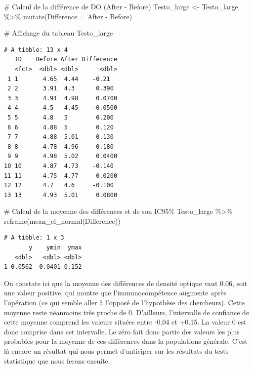 \documentclass[
  a4paper,
  DIV=11,
  numbers=noendperiod,
  oneside]{scrreprt}
\newenvironment{Shaded}{}{}
\newcommand{\AttributeTok}[1]{\textcolor[rgb]{0.84,0.23,0.29}{#1}}
\newcommand{\CommentTok}[1]{\textcolor[rgb]{0.42,0.45,0.49}{#1}}
\newcommand{\FunctionTok}[1]{\textcolor[rgb]{0.44,0.26,0.76}{#1}}
\newcommand{\NormalTok}[1]{\textcolor[rgb]{0.14,0.16,0.18}{#1}}
\newcommand{\OtherTok}[1]{\textcolor[rgb]{0.44,0.26,0.76}{#1}}
\newcommand{\SpecialCharTok}[1]{\textcolor[rgb]{0.00,0.36,0.77}{#1}}
\begin{document}
\begin{Shaded}
\begin{Highlighting}[]
\CommentTok{\# Calcul de la différence de DO (After {-} Before)}
\NormalTok{Testo\_large }\OtherTok{\textless{}{-}}\NormalTok{ Testo\_large }\SpecialCharTok{\%\textgreater{}\%} 
  \FunctionTok{mutate}\NormalTok{(}\AttributeTok{Difference =}\NormalTok{ After }\SpecialCharTok{{-}}\NormalTok{ Before)}

\CommentTok{\# Affichage du tableau}
\NormalTok{Testo\_large}
\end{Highlighting}
\end{Shaded}

\begin{verbatim}
# A tibble: 13 x 4
   ID    Before After Difference
   <fct>  <dbl> <dbl>      <dbl>
 1 1       4.65  4.44    -0.21  
 2 2       3.91  4.3      0.390 
 3 3       4.91  4.98     0.0700
 4 4       4.5   4.45    -0.0500
 5 5       4.8   5        0.200 
 6 6       4.88  5        0.120 
 7 7       4.88  5.01     0.130 
 8 8       4.78  4.96     0.180 
 9 9       4.98  5.02     0.0400
10 10      4.87  4.73    -0.140 
11 11      4.75  4.77     0.0200
12 12      4.7   4.6     -0.100 
13 13      4.93  5.01     0.0800
\end{verbatim}

\begin{Shaded}
\begin{Highlighting}[]
\CommentTok{\# Calcul de la moyenne des différences et de son IC95\%}
\NormalTok{Testo\_large }\SpecialCharTok{\%\textgreater{}\%} 
  \FunctionTok{reframe}\NormalTok{(}\FunctionTok{mean\_cl\_normal}\NormalTok{(Difference))}
\end{Highlighting}
\end{Shaded}

\begin{verbatim}
# A tibble: 1 x 3
       y    ymin  ymax
   <dbl>   <dbl> <dbl>
1 0.0562 -0.0401 0.152
\end{verbatim}

On constate ici que la moyenne des différences de densité optique vaut
0.06, soit une valeur positive, qui montre que l'immunocompétence
augmente après l'opération (ce qui semble aller à l'opposé de
l'hypothèse des chercheurs). Cette moyenne reste néanmoins très proche
de 0. D'ailleurs, l'intervalle de confiance de cette moyenne comprend
les valeurs situées entre -0.04 et +0.15. La valeur 0 est donc comprise
dans cet intervalle. Le zéro fait donc partie des valeurs les plus
probables pour la moyenne de ces différences dans la populations
générale. C'est là encore un résultat qui nous permet d'anticiper sur
les résultats du tests statistique que nous ferons ensuite.
\end{document}
